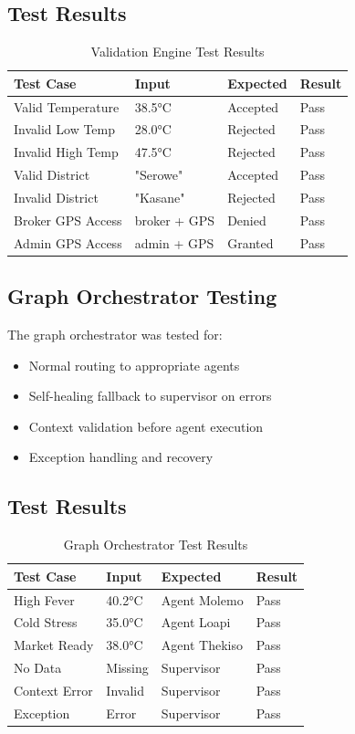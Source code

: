 \subsection{Test Results}

\begin{table}[H]
\centering
\begin{tabular}{|l|l|l|l|}
\hline
\textbf{Test Case} & \textbf{Input} & \textbf{Expected} & \textbf{Result} \\
\hline
Valid Temperature & 38.5°C & Accepted & Pass \\
Invalid Low Temp & 28.0°C & Rejected & Pass \\
Invalid High Temp & 47.5°C & Rejected & Pass \\
Valid District & "Serowe" & Accepted & Pass \\
Invalid District & "Kasane" & Rejected & Pass \\
Broker GPS Access & broker + GPS & Denied & Pass \\
Admin GPS Access & admin + GPS & Granted & Pass \\
\hline
\end{tabular}
\caption{Validation Engine Test Results}
\end{table}

\subsection{Graph Orchestrator Testing}

The graph orchestrator was tested for:

\begin{itemize}
    \item Normal routing to appropriate agents
    \item Self-healing fallback to supervisor on errors
    \item Context validation before agent execution
    \item Exception handling and recovery
\end{itemize}

\subsection{Test Results}

\begin{table}[H]
\centering
\begin{tabular}{|l|l|l|l|}
\hline
\textbf{Test Case} & \textbf{Input} & \textbf{Expected} & \textbf{Result} \\
\hline
High Fever & 40.2°C & Agent Molemo & Pass \\
Cold Stress & 35.0°C & Agent Loapi & Pass \\
Market Ready & 38.0°C & Agent Thekiso & Pass \\
No Data & Missing & Supervisor & Pass \\
Context Error & Invalid & Supervisor & Pass \\
Exception & Error & Supervisor & Pass \\
\hline
\end{tabular}
\caption{Graph Orchestrator Test Results}
\end{table}

